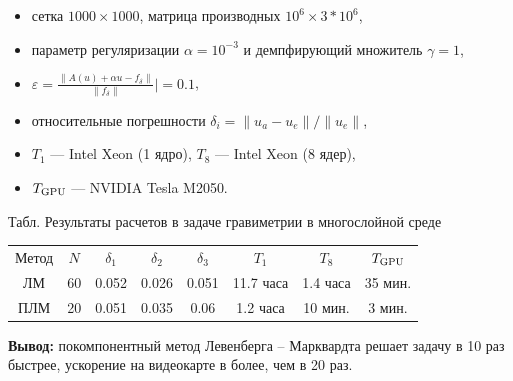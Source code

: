 \documentclass[10pt,pdf, mathserif, hyperref={unicode}]{beamer}
\begin{document}
\begin{frame}
	\begin{itemize}
		\item сетка $1000\times1000$, матрица производных $10^6\times 3*10^6$,
		\item параметр регуляризации $\alpha=10^{-3}$ и демпфирующий множитель $\gamma=1$,
		\item $\varepsilon=\frac{\|A(u)+\alpha u-f_\delta\|}{\|f_\delta\|}|=0.1$,
		\item относительные погрешности $\delta_i=\|u_a-u_e\|/\|u_e\|$,
		\item $T_1$ --- Intel Xeon (1 ядро), $T_8$ --- Intel Xeon (8 ядер),	
		\item $T_{\textup{GPU}}$ --- NVIDIA Tesla M2050.
	\end{itemize}
	\begin{table} 
		\centering
		\renewcommand{\arraystretch}{1.5} 
		{\scriptsize Табл. Результаты расчетов в задаче гравиметрии в многослойной среде}
		\small
\begin{tabular}{|c|c|c|c|c|c|c|c|}
\hline
\multirow{2}{*}{Метод} & \multirow{2}{*}{$N$} & \multirow{2}{*}{$\delta_1$} & \multirow{2}{*}{$\delta_2$} & \multirow{2}{*}{$\delta_3$} & \multirow{2}{*}{$T_1$} & \multirow{2}{*}{$T_8$} & \multirow{2}{*}{$T_{\textup{GPU}}$} \\
                       &                      &                             &                             &                             &                        &                        &                                     \\ \hline
ЛМ                     & 60                   & 0.052                       & 0.026                       & 0.051                       & 11.7 часа                & 1.4 часа                 & 35 мин.                             \\ \hline
ПЛМ                    & 20                   & 0.051                       & 0.035                       & 0.06                        & 1.2 часа                 & 10 мин.                & 3 мин.                              \\ \hline
\end{tabular}
	\end{table}

\textbf{\color{blue}Вывод:} покомпонентный метод Левенберга -- Марквардта решает задачу в 10 раз быстрее, ускорение на видеокарте в более, чем в 20 раз.
\end{frame}
\end{document}
